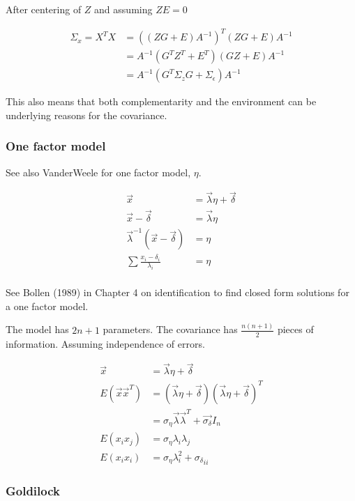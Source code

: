 \documentclass[]{article} %
\begin{document}
After centering of $Z$ and assuming $Z E = 0$

\begin{align}
\Sigma_x = X^TX 
     &= ((Z G + E)A^{-1})^T (Z G + E)A^{-1} \nonumber \\
     &= A^{-1} (G^T Z^T + E^T) (G Z + E) A^{-1} \nonumber \\
     &= A^{-1} (G^T \Sigma_z G + \Sigma_{\epsilon}) A^{-1} \label{eq:covariance}
\end{align}

This also means that both complementarity and the environment can be underlying reasons for the covariance. 

\subsubsection{One factor model}

See also VanderWeele for one factor model, $\eta$.

\begin{align*}
    \vec{x} &= \vec{\lambda} \eta + \vec{\delta} \\
    \vec{x} - \vec{\delta} &= \vec{\lambda} \eta \\
    \vec{\lambda}^{-1} (\vec{x} - \vec{\delta}) &= \eta \\ 
    \sum \frac{x_i - \delta_i}{\lambda_i} &= \eta \\
\end{align*}

See Bollen (1989) in Chapter 4 on identification to find closed form solutions for a 
one factor model.

The model has $2n + 1$ parameters. The covariance has $\frac{n (n+1)}{2}$ pieces of information. Assuming independence of errors.

\begin{align*}
    \vec{x} &= \vec{\lambda} \eta + \vec{\delta} \\
    E(\vec{x} \vec{x}^{T}) &= (\vec{\lambda} \eta + \vec{\delta})
        (\vec{\lambda} \eta + \vec{\delta})^{T} \\
    &= \sigma_{\eta} \vec{\lambda} \vec{\lambda}^{T} + \vec{\sigma_{\delta}} I_n \\
    E(x_i x_j) &= \sigma_{\eta} \lambda_i \lambda_j \\ 
    E(x_i x_i) &= \sigma_{\eta} \lambda_i^2 + {\sigma_{\delta}}_{ii}
\end{align*}

\subsubsection{Goldilock}
\end{document}
